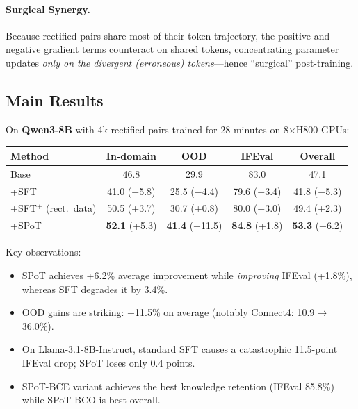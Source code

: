 \documentclass[11pt]{article}
\begin{document}
\paragraph{Surgical Synergy.} Because rectified pairs share most of their token trajectory, the positive and negative gradient terms counteract on shared tokens, concentrating parameter updates \emph{only on the divergent (erroneous) tokens}---hence ``surgical'' post-training.

\subsection{Main Results}

On \textbf{Qwen3-8B} with 4k rectified pairs trained for 28 minutes on 8$\times$H800 GPUs:

\begin{table}[h]
\centering
\begin{tabular}{lcccc}
\toprule
\textbf{Method} & \textbf{In-domain} & \textbf{OOD} & \textbf{IFEval} & \textbf{Overall} \\
\midrule
Base           & 46.8 & 29.9 & 83.0 & 47.1 \\
+SFT           & 41.0 {\scriptsize($-$5.8)} & 25.5 {\scriptsize($-$4.4)} & 79.6 {\scriptsize($-$3.4)} & 41.8 {\scriptsize($-$5.3)} \\
+SFT$^+$ (rect.~data) & 50.5 {\scriptsize(+3.7)} & 30.7 {\scriptsize(+0.8)} & 80.0 {\scriptsize($-$3.0)} & 49.4 {\scriptsize(+2.3)} \\
+SPoT          & \textbf{52.1} {\scriptsize(+5.3)} & \textbf{41.4} {\scriptsize(+11.5)} & \textbf{84.8} {\scriptsize(+1.8)} & \textbf{53.3} {\scriptsize(+6.2)} \\
\bottomrule
\end{tabular}
\end{table}

\noindent Key observations:
\begin{itemize}
    \item SPoT achieves +6.2\% average improvement while \emph{improving} IFEval (+1.8\%), whereas SFT degrades it by 3.4\%.
    \item OOD gains are striking: +11.5\% on average (notably Connect4: 10.9$\to$36.0\%).
    \item On Llama-3.1-8B-Instruct, standard SFT causes a catastrophic 11.5-point IFEval drop; SPoT loses only 0.4 points.
    \item SPoT-BCE variant achieves the best knowledge retention (IFEval 85.8\%) while SPoT-BCO is best overall.
\end{itemize}
\end{document}
